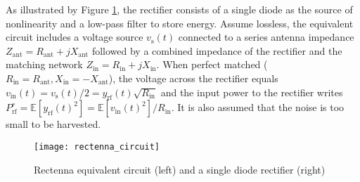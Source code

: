 As illustrated by Figure \ref{fig:rectenna_circuit}, the rectifier consists of a single diode as the source of nonlinearity and a low-pass filter to store energy. Assume lossless, the equivalent circuit includes a voltage source ${v_{\text{s}}}(t)$ connected to a series antenna impedance ${Z_{{\text{ant}}}} = {R_{{\text{ant}}}} + j{X_{{\text{ant}}}}$ followed by a combined impedance of the rectifier and the matching network ${Z_{{\text{in}}}} = {R_{{\text{in}}}} + j{X_{{\text{in}}}}$. When perfect matched (${R_{{\text{in}}}} = {R_{{\text{ant}}}},{X_{{\text{in}}}} =  - {X_{{\text{ant}}}}$), the voltage across the rectifier equals ${v_{{\text{in}}}}(t) = {v_{\text{s}}}(t)/2 = {y_{{\text{rf}}}}(t)\sqrt {{R_{{\text{in}}}}} $ and the input power to the rectifier writes $P_{{\text{rf}}}^r = \mathbb{E}\left[ {{y_{{\text{rf}}}}{{(t)}^2}} \right] = \mathbb{E}\left[ {{v_{{\text{in}}}}{{(t)}^2}} \right]/{R_{{\text{in}}}}$. It is also assumed that the noise is too small to be harvested.

\begin{figure}
  \centering
    \texttt{[image: rectenna\_circuit]}
  \caption{Rectenna equivalent circuit (left) and a single diode rectifier (right) \cite{Clerckx2018a}}
  \label{fig:rectenna_circuit}
\end{figure} 